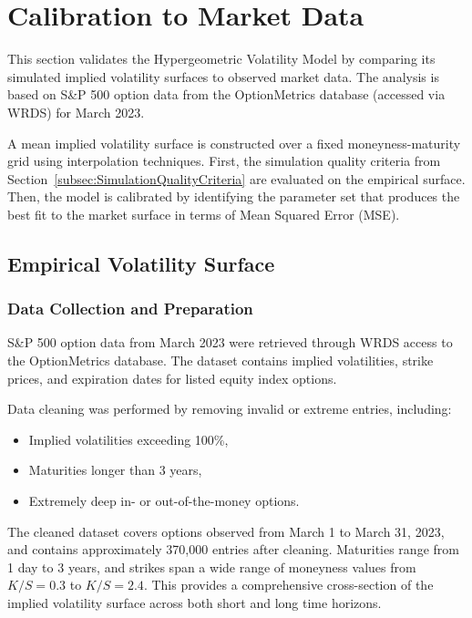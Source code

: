 \section{Calibration to Market Data} \label{sec:Calibration}

This section validates the Hypergeometric Volatility Model by comparing its simulated implied volatility surfaces to observed market data. The analysis is based on S\&P 500 option data from the OptionMetrics database (accessed via WRDS) for March 2023.

A mean implied volatility surface is constructed over a fixed moneyness-maturity grid using interpolation techniques. First, the simulation quality criteria from Section~\ref{subsec:SimulationQualityCriteria} are evaluated on the empirical surface. Then, the model is calibrated by identifying the parameter set that produces the best fit to the market surface in terms of Mean Squared Error (MSE).


\subsection{Empirical Volatility Surface} \label{subsec:EmpiricalVolatilitySurface}

\subsubsection*{Data Collection and Preparation}
S\&P 500 option data from March 2023 were retrieved through WRDS access to the OptionMetrics database. The dataset contains implied volatilities, strike prices, and expiration dates for listed equity index options.

Data cleaning was performed by removing invalid or extreme entries, including:
\begin{itemize}
    \item Implied volatilities exceeding 100\%,
    \item Maturities longer than 3 years,
    \item Extremely deep in- or out-of-the-money options.
\end{itemize}
The cleaned dataset covers options observed from March 1 to March 31, 2023, and contains approximately 370{,}000 entries after cleaning. Maturities range from 1 day to 3 years, and strikes span a wide range of moneyness values from $K/S = 0.3$ to $K/S = 2.4$. This provides a comprehensive cross-section of the implied volatility surface across both short and long time horizons.

